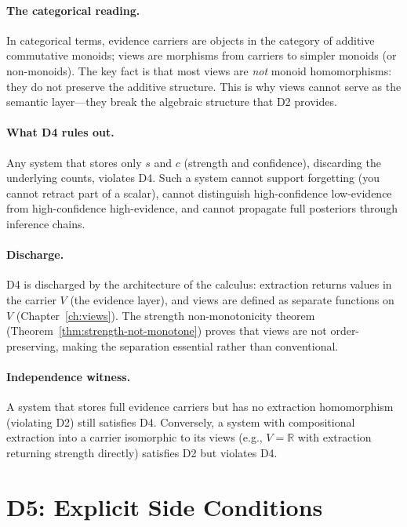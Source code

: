 \paragraph{The categorical reading.}
In categorical terms, evidence carriers are objects in the category
of additive commutative monoids; views are morphisms from carriers to
simpler monoids (or non-monoids).  The key fact is that most views
are \emph{not} monoid homomorphisms: they do not preserve the
additive structure.  This is why views cannot serve as the semantic
layer---they break the algebraic structure that D2 provides.

\paragraph{What D4 rules out.}
Any system that stores only $s$ and $c$ (strength and confidence),
discarding the underlying counts, violates D4.  Such a system cannot
support forgetting (you cannot retract part of a scalar), cannot
distinguish high-confidence low-evidence from high-confidence
high-evidence, and cannot propagate full posteriors through inference
chains.

\paragraph{Discharge.}
D4 is discharged by the architecture of the calculus: extraction
returns values in the carrier $V$ (the evidence layer), and views
are defined as separate functions on $V$ (Chapter~\ref{ch:views}).
The strength non-monotonicity theorem
(Theorem~\ref{thm:strength-not-monotone}) proves that views are not
order-preserving, making the separation essential rather than
conventional.

\paragraph{Independence witness.}
A system that stores full evidence carriers but has no extraction
homomorphism (violating D2) still satisfies D4.  Conversely, a system
with compositional extraction into a carrier isomorphic to its views
(e.g., $V = \mathbb{R}$ with extraction returning strength directly)
satisfies D2 but violates D4.


\section{D5: Explicit Side Conditions}
\label{sec:d5}

